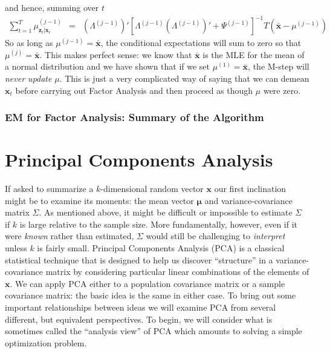 \documentclass[12pt]{article}
\theoremstyle{definition}
\begin{document}
and hence, summing over $t$
	\begin{eqnarray*}
		\sum_{t = 1}^T \mu^{(j-1)}_{\mathbf{z}_t|\mathbf{x}_t} &=& \left(\Lambda^{(j-1)}\right)' \left[\Lambda^{(j-1)} \left(\Lambda^{(j-1)}\right)' + \Psi^{(j-1)}\right]^{-1} T\left(\bar{\mathbf{x}} - \mu^{(j-1)} \right)
 	\end{eqnarray*}
So as long as $\mu^{(j-1)} = \bar{\mathbf{x}}$, the conditional expectations will sum to zero so that $\mu^{(j)} = \bar{\mathbf{x}}$. This makes perfect sense: we know that $\bar{\mathbf{x}}$ is the MLE for the mean of a normal distribution and we have shown that if we set $\mu^{(1)} = \bar{\mathbf{x}}$, the M-step will \emph{never update} $\mu$. This is just a very complicated way of saying that we can demean $\mathbf{x}_t$ before carrying out Factor Analysis and then proceed as though $\mu$ were zero. 

\subsubsection{EM for Factor Analysis: Summary of the Algorithm}



\section{Principal Components Analysis}
If asked to summarize a $k$-dimensional random vector $\mathbf{x}$ our first inclination might be to examine its moments: the mean vector $\boldsymbol{\mu}$ and variance-covariance matrix $\Sigma$. As mentioned above, it might be difficult or impossible to estimate $\Sigma$ if $k$ is large relative to the sample size. More fundamentally, however, even if it were \emph{known} rather than estimated, $\Sigma$ would still be challenging to \emph{interpret} unless $k$ is fairly small. Principal Components Analysis (PCA) is a classical statistical technique that is designed to help us discover ``structure'' in a variance-covariance matrix by considering particular linear combinations of the elements of $\mathbf{x}$. We can apply PCA either to a population covariance matrix or a sample covariance matrix: the basic idea is the same in either case. To bring out some important relationships between ideas we will examine PCA from several different, but equivalent perspectives. To begin, we will consider what is sometimes called the ``analysis view'' of PCA which amounts to solving a simple optimization problem. 
\end{document}
